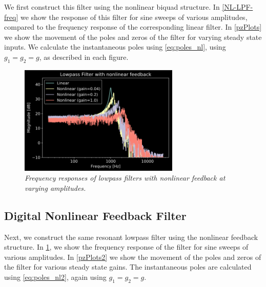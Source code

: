 \documentclass[twoside,a4paper]{article}
\begin{document}
We first construct this filter using the nonlinear biquad structure.
In \cref{NL-LPF-freq} we show the response of this filter for sine sweeps of
various amplitudes, compared to the frequency response of the corresponding
linear filter. In \cref{pzPlots} we show the movement of the poles and zeros of
the filter for varying steady state inputs. We calculate the instantaneous
poles using \cref{eq:poles_nl}, using $g_1 = g_2 = g$, as described in
each figure.
%
\begin{figure}[ht]
    \center
    \includegraphics[width=3in]{../../NonlinearFeedback/Pics/LPF-NL.png}
    \caption{\label{NL2-LPF-freq}{\it Frequency responses of lowpass
                                    filters with nonlinear feedback
                                    at varying amplitudes.}}
\end{figure}
%

\subsection{Digital Nonlinear Feedback Filter}
%
Next, we construct the same resonant lowpass filter
using the nonlinear feedback structure. In \cref{NL2-LPF-freq},
we show the frequency response of the filter for sine sweeps of
various amplitudes. In \cref{pzPlots2} we show the movement of the
poles and zeros of the filter for various steady state gains. The
instantaneous poles are calculated using \cref{eq:poles_nl2}, again
using $g_1 = g_2 = g$.
\end{document}
